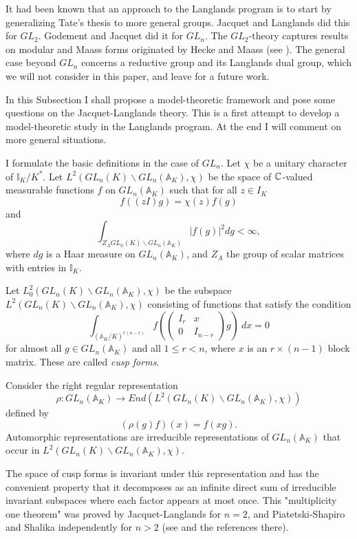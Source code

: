 \documentclass[12pt]{amsart}
\def\A{\mathbb{A}}
\def\I{\mathbb{I}}
\numberwithin{equation}{section}
\begin{document}
It had been known that an approach to the Langlands program is to start by generalizing Tate's thesis to more general groups. Jacquet and Langlands \cite{jac-lang} did this for $GL_2$. Godement and Jacquet \cite{jaq-good} did it for $GL_n$. 
The $GL_2$-theory captures results on modular and Maass forms originated by Hecke and Maass (see \cite{lang-jer}). The general case beyond $GL_n$ concerns a reductive group and its Langlands dual group, which we will not consider in this paper, and leave for a future work.

In this Subsection I shall propose a model-theoretic framework and pose some questions on the 
Jacquet-Langlands theory. This is a first attempt to develop a model-theoretic study in the Langlands program. At the end I will comment on more general situations.

I formulate the basic definitions in the case of $GL_n$. Let $\chi$ be a unitary character of $\I_K/K^*$. Let $L^2(GL_n(K)\backslash GL_n(\A_K),\chi)$ be 
the space of $\Bbb C$-valued measurable functions $f$ on $GL_n(\A_K)$ such that for all $z\in I_K$
$$f((zI)g)=\chi(z)f(g)$$
and 
$$\int_{Z_A GL_n(K)\backslash GL_n(\A_K)} |f(g)|^2dg<\infty,$$
where $dg$ is a Haar measure on $GL_n(\A_K)$, and $Z_A$ the group of scalar matrices with entries in $\I_K$. 

Let $L^2_0(GL_n(K)\backslash GL_n(\A_K),\chi)$ be the subspace $L^2(GL_n(K)\backslash GL_n(\A_K),\chi)$ consisting of functions that satisfy the condition 
$$\int_{(\A_K/K)^{r(n-r)} }f(\begin{pmatrix}
I_r & x\\
0 & I_{n-r}
\end{pmatrix}g) ~ dx=0$$
for almost all $g\in GL_n(\A_K)$ and all $1\leq r<n$, where $x$ is an $r\times(n-1)$ block matrix. These are called {\it cusp forms}. 

Consider the right regular representation 
$$\rho: GL_n(\A_K) \rightarrow End(L^2(GL_n(K)\backslash GL_n(\A_K),\chi))$$ defined by $$(\rho(g)f)(x)=f(xg).$$
Automorphic representations are irreducible representations of $GL_n(\A_K)$ that occur in $L^2(GL_n(K)\backslash GL_n(\A_K),\chi)$. 

The space of cusp forms is invariant under this representation and has the convenient property that it decomposes as an infinite direct sum of irreducible invariant subspaces where each factor appears at most once. This "multiplicity one theorem" was proved by Jacquet-Langlands for $n=2$, and Piatetski-Shapiro and Shalika independently for $n>2$ (see \cite{bump} and the references there).
\end{document}
